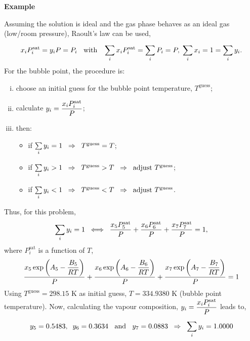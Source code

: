 \begin{MyExample}{\begin{center}{\bf Example}\end{center}}
     Assuming the solution is ideal and the gas phase behaves as an ideal gas (\ie low/room pressure), Raoult's law can be used,
    \begin{displaymath}
       x_{i}P_{i}^{\text{sat}} = y_{i}P = P_{i} \;\;\text{ with }\;\; \summation[x_{i}P_{i}^{\text{sat}}]{i}{} = \summation[P_{i}]{i}{} = P, \;\summation[x_{i}]{i}{}=1=\summation[y_{i}]{i}{}.
    \end{displaymath}
    For the bubble point, the procedure is:
    \begin{enumerate}[i)]
       \item choose an initial guess for the bubble point temperature, $T^{\text{guess}}$;
       \item calculate $y_{i}=\frc{x_{i}P_{i}^{\text{sat}}}{P}$;
       \item then:
           \begin{itemize}
              \item if $\summation[y_{i}]{i}{} = 1 \;\;\Rightarrow \;\; T^{\text{guess}} = T$;
              \item if $\summation[y_{i}]{i}{} > 1 \;\;\Rightarrow \;\; T^{\text{guess}} > T \;\; \Rightarrow\;\; \text{adjust } T^{\text{guess}}$;
              \item if $\summation[y_{i}]{i}{} < 1 \;\;\Rightarrow \;\; T^{\text{guess}} < T \;\; \Rightarrow\;\; \text{adjust } T^{\text{guess}}$.
           \end{itemize}
    \end{enumerate}
    Thus, for this problem,
    \begin{displaymath}
        \summation[y_{i}]{i}{} = 1\;\; \Longleftrightarrow \;\; \frc{x_{5}P_{5}^{\text{sat}}}{P} + \frc{x_{6}P_{6}^{\text{sat}}}{P} + \frc{x_{7}P_{7}^{\text{sat}}}{P} = 1,
    \end{displaymath}
    where $P_{i}^{\text{sat}}$ is a function of $T$, 
    \begin{displaymath}
        \frc{x_{5}\exp{\left(A_{5}-\frc{B_{5}}{RT}\right)}}{P} + \frc{x_{6}\exp{\left(A_{6}-\frc{B_{6}}{RT}\right)}}{P} + \frc{x_{7}\exp{\left(A_{7}-\frc{B_{7}}{RT}\right)}}{P} = 1
    \end{displaymath}
    Using $T^{\text{guess}}=298.15$ K as initial guess, $T=334.9380$ K (bubble point temperature). Now, calculating the vapour composition, $y_{i}=\frc{x_{i}P_{i}^{\text{sat}}}{P}$ leads to,
    \begin{displaymath}
        y_{5} =0.5483,\;\; y_{6} = 0.3634\;\;\text{ and }\;\;y_{7} = 0.0883\;\;\Rightarrow\;\; \summation[y_{i}]{i}{} = 1.0000
    \end{displaymath}


\end{MyExample}
